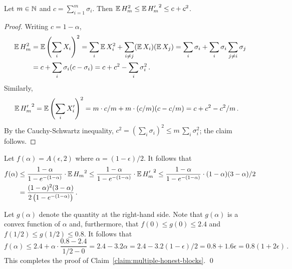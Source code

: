   \begin{fact}\label{fact:second-moment-equal-unequal-stake}
    Let $m \in \mathbb{N}$ and $c = \sum_{i = 1}^m \sigma_i$. 
    Then $\operatorname{\mathbb{E}} H_m^2 \leq \operatorname{\mathbb{E}} {H'_m}^2 \leq c + c^2$.
  \end{fact}
  \begin{proof}
    Writing $c = 1 - \alpha$, 
    \begin{align*}
      \operatorname{\mathbb{E}} H_m^2 
      &=\operatorname{\mathbb{E}} \left(\sum_i X_i\right)^2 
      = \sum_i \operatorname{\mathbb{E}} X_i^2 + \sum_{i \neq j} (\operatorname{\mathbb{E}} X_i)(\operatorname{\mathbb{E}} X_j) 
      = \sum_i \sigma_i + \sum_i \sigma_i \sum_{j \neq i} \sigma_j \\ 
      &= c + \sum_i \sigma_i (c - \sigma_i) 
      = c + c^2 - \sum_i{\sigma_i^2}
      \,.      
    \end{align*}
    Similarly,
    \begin{align*}
      \operatorname{\mathbb{E}} {H'_m}^2 
      &=\operatorname{\mathbb{E}} \left(\sum_i X'_i\right)^2 
      = m \cdot c/m + m \cdot (c/m) (c - c/m) 
      = c + c^2 - c^2/m
      \,.      
    \end{align*}
    By the Cauchy-Schwartz inequality, 
    $
      c^2 = \left(\sum_i \sigma_i \right)^2 \leq m \, \sum_i \sigma_i^2
    $; the claim follows.
  \end{proof}

  Let $f(\alpha) = A(\epsilon, 2)$ where $\alpha = (1-\epsilon)/2$.
  It follows that 
  \begin{align*}
    f(\alpha) 
    &\leq \frac{1 - \alpha}{1 - e^{-(1 - \alpha)}} \cdot \operatorname{\mathbb{E}} {H_m}^2
    \leq \frac{1 - \alpha}{1 - e^{-(1 - \alpha)}} \cdot \operatorname{\mathbb{E}} {H'_m}^2
    \leq \frac{1 - \alpha}{1 - e^{-(1 - \alpha)}} \cdot (1-\alpha) (3 - \alpha)/2 \\
    &= \frac{(1 - \alpha)^2 (3 - \alpha)}{2 \left( 1 - e^{-(1 - \alpha)} \right)}
    \,.
  \end{align*}

  Let $g(\alpha)$ denote the quantity at the right-hand side. 
  Note that $g(\alpha)$ is a convex function of $\alpha$ 
  and, furthermore, that $f(0)\leq g(0) \leq 2.4$ 
  and $f(1/2) \leq g(1/2) \leq 0.8$.
  It follows that 
  $$
  f(\alpha) 
  \leq 2.4 + \alpha \cdot \frac{0.8-2.4}{1/2 - 0}
  = 2.4 - 3.2 \alpha
  = 2.4 - 3.2 (1 - \epsilon)/2
  = 0.8  + 1.6 \epsilon
  = 0.8 (1 + 2 \epsilon)
  \,.
  $$
  This completes the proof of Claim~\ref{claim:multiple-honest-blocks}.
  \hfill\qed